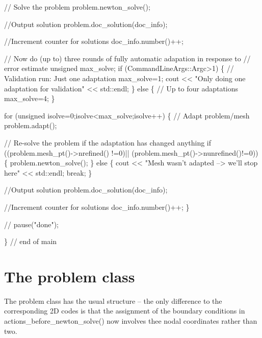 \begin{DoxyCodeInclude}
 \textcolor{comment}{// Solve the problem}
 problem.newton\_solve();
 
 \textcolor{comment}{//Output solution}
 problem.doc\_solution(doc\_info);

 \textcolor{comment}{//Increment counter for solutions }
 doc\_info.number()++;

 \textcolor{comment}{// Now do (up to) three rounds of fully automatic adapation in response to }
 \textcolor{comment}{// error estimate}
 \textcolor{keywordtype}{unsigned} max\_solve;
 \textcolor{keywordflow}{if} (CommandLineArgs::Argc>1)
  \{
   \textcolor{comment}{// Validation run: Just one adaptation}
   max\_solve=1;
   cout << \textcolor{stringliteral}{"Only doing one adaptation for validation"} << std::endl;
  \}
 \textcolor{keywordflow}{else}
  \{
   \textcolor{comment}{// Up to four adaptations}
   max\_solve=4;
  \}

 \textcolor{keywordflow}{for} (\textcolor{keywordtype}{unsigned} isolve=0;isolve<max\_solve;isolve++)
  \{
   \textcolor{comment}{// Adapt problem/mesh}
   problem.adapt(); 
         
   \textcolor{comment}{// Re-solve the problem if the adaptation has changed anything}
   \textcolor{keywordflow}{if} ((problem.mesh\_pt()->nrefined()  !=0)||
       (problem.mesh\_pt()->nunrefined()!=0))
    \{
     problem.newton\_solve();
    \}
   \textcolor{keywordflow}{else}
    \{
     cout << \textcolor{stringliteral}{"Mesh wasn't adapted --> we'll stop here"} << std::endl;
     \textcolor{keywordflow}{break};
    \}
   
   \textcolor{comment}{//Output solution}
   problem.doc\_solution(doc\_info);
   
   \textcolor{comment}{//Increment counter for solutions }
   doc\_info.number()++;
  \}

\textcolor{comment}{// pause("done");}

\} \textcolor{comment}{// end of main}

\end{DoxyCodeInclude}




 

\hypertarget{index_problem}{}\section{The problem class}\label{index_problem}
The problem class has the usual structure -- the only difference to the corresponding 2D codes is that the assignment of the boundary conditions in {\ttfamily actions\+\_\+before\+\_\+newton\+\_\+solve()} now involves thee nodal coordinates rather than two.

